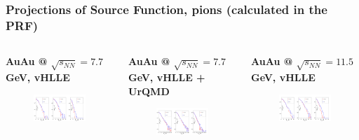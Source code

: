 \documentclass[dvipsnames] {beamer}
\begin{document}
\begin{frame}[shrink=40]
  \frametitle{{\small \bf \centering Projections of Source Function, pions (calculated in the PRF)}}
  \begin{columns}
    \begin{block}{\bf  \centering AuAu @ $\sqrt{s_{NN}} = 7.7$ GeV, vHLLE}
      \begin{figure}[H]
         \includegraphics[width=1.\linewidth]{SF_vHLLE_77gev.png}
      \end{figure}
    \end{block}
    \begin{block}{\bf  \centering AuAu @ $\sqrt{s_{NN}} = 7.7$ GeV, vHLLE + UrQMD}
      \begin{figure}[H]
        \includegraphics[width=1.\linewidth]{SF_vHLLE_UrQMD_77gev.png} \\
      \end{figure}
    \end{block}
     \begin{block}{\bf \centering AuAu @ $\sqrt{s_{NN}} = 11.5$ GeV, vHLLE}
       \begin{figure}[H]
         \includegraphics[width=1.\linewidth]{SF_vHLLE_115gev.png}

\end{figure}
\end{block}
\end{columns}
\end{frame}
\end{document}
